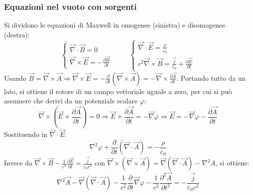 \documentclass[10pt, a4paper]{scrartcl}
\numberwithin{equation}{subsection}
\theoremstyle{style1}
\begin{document}
\subsubsection{Equazioni nel vuoto con sorgenti}
Si dividono le equazioni di Maxwell in omogenee (sinistra) e disomogenee (destra):
\[
\begin{cases}
	\vec{\nabla }\cdot \vec{B}=0\\
	\vec{\nabla }\times \vec{E} = - \frac{\partial \vec{B}}{\partial t} 
	\end{cases}\hspace{1cm}\begin{cases}
	\vec{\nabla }\cdot \vec{E}=\frac{\rho}{\varepsilon_0}\\
	c^2 \vec{\nabla }\times \vec{B} = \frac{\vec{j}}{\varepsilon _0} + \frac{\partial \vec{E}}{\partial t} 
\end{cases}
\] 
Usando $\vec{B}= \vec{\nabla }\times \vec{A}\Rightarrow \vec{\nabla }\times \vec{E}= - \frac{\partial }{\partial t} (\vec{\nabla}\times \vec{A}) = - \vec{\nabla }\times \frac{\partial \vec{A}}{\partial t} $. Portando tutto da un lato, si ottiene il rotore di un campo vettoriale uguale a zero, per cui si pu\`o assumere che derivi da un potenziale scalare $\varphi $:
\begin{equation}
	\vec{\nabla }\times \left(\vec{E}+\frac{\partial \vec{A}}{\partial t} \right) =0\Rightarrow \vec{E}+\frac{\partial \vec{A}}{\partial t} = - \vec{\nabla }\varphi \Rightarrow \vec{E}= - \vec{\nabla }\varphi  - \frac{\partial \vec{A}}{\partial t} 
\end{equation}
Sostituendo in $\vec{\nabla}\cdot \vec{E}$:
\begin{equation}
	\nabla ^2 \varphi  + \frac{\partial }{\partial t} (\vec{\nabla }\cdot \vec{A}) = - \frac{\rho}{\varepsilon _0}
\end{equation}
Invece da $\vec{\nabla }\times \vec{B}- \frac{1}{c^2}\frac{\partial \vec{E}}{\partial t} = \frac{\vec{j}}{\varepsilon _0 c^2}$ con $\vec{\nabla }\times (\vec{\nabla }\times \vec{A}) = \vec{\nabla }(\vec{\nabla }\cdot \vec{A}) - \nabla ^2 A$, si ottiene:
\begin{equation}
\nabla ^2 \vec{A} - \vec{\nabla }(\vec{\nabla }\cdot \vec{A}) - \frac{1}{c^2 }\frac{\partial }{\partial t}  \vec{\nabla }\varphi - \frac{1}{c^2} \frac{\partial ^2 \vec{A}}{\partial t^2} = - \frac{\vec{j}}{\varepsilon _0 c^2}
\end{equation}
\end{document}
